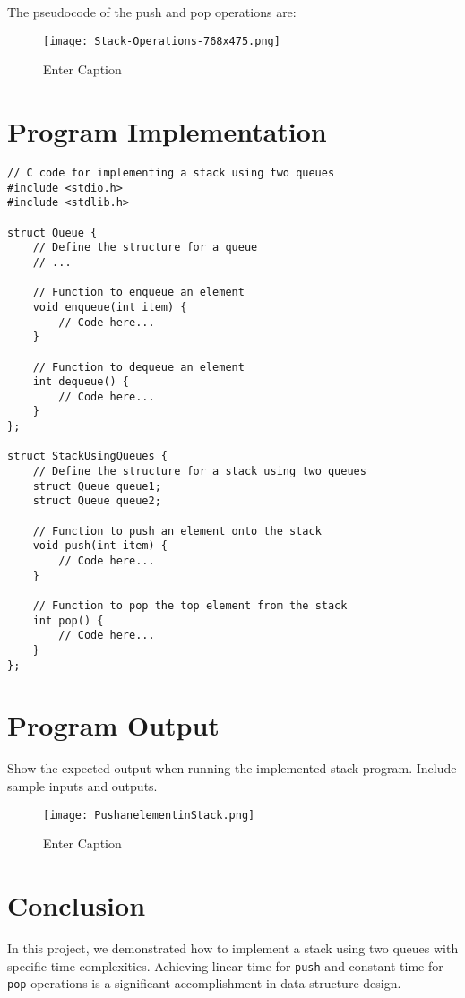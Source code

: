 \documentclass{article}
\begin{document}
The pseudocode of the push and pop operations are:
\begin{figure}
    \centering
    \texttt{[image: Stack-Operations-768x475.png]}
    \caption{Enter Caption}
    \label{fig:enter-label}
\end{figure}
\section{Program Implementation}
\lstset{language=C}
\begin{lstlisting}
// C code for implementing a stack using two queues
#include <stdio.h>
#include <stdlib.h>

struct Queue {
    // Define the structure for a queue
    // ...

    // Function to enqueue an element
    void enqueue(int item) {
        // Code here...
    }

    // Function to dequeue an element
    int dequeue() {
        // Code here...
    }
};

struct StackUsingQueues {
    // Define the structure for a stack using two queues
    struct Queue queue1;
    struct Queue queue2;

    // Function to push an element onto the stack
    void push(int item) {
        // Code here...
    }

    // Function to pop the top element from the stack
    int pop() {
        // Code here...
    }
};
\end{lstlisting}

\section{Program Output}
Show the expected output when running the implemented stack program. Include sample inputs and outputs.
\begin{figure}
    \centering
    \texttt{[image: PushanelementinStack.png]}
    \caption{Enter Caption}
    \label{fig:enter-label}
\end{figure}
\section{Conclusion}
In this project, we demonstrated how to implement a stack using two queues with specific time complexities. Achieving linear time for \texttt{push} and constant time for \texttt{pop} operations is a significant accomplishment in data structure design.
\end{document}
